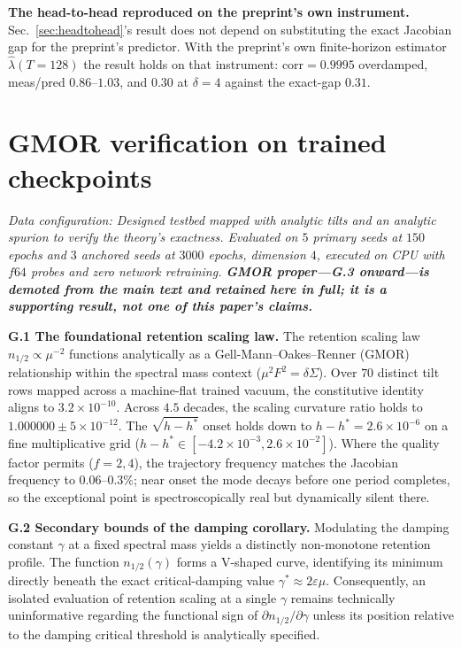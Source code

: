 \documentclass{article}
\begin{document}
\textbf{The head-to-head reproduced on the preprint's own instrument.} Sec.~\ref{sec:headtohead}'s result does not depend on substituting the exact Jacobian gap for the preprint's predictor. With the preprint's own finite-horizon estimator $\hat\lambda(T{=}128)$ the result holds on that instrument: $\mathrm{corr}=0.9995$ overdamped, meas/pred $0.86$--$1.03$, and $0.30$ at $\delta=4$ against the exact-gap $0.31$.

\section{GMOR verification on trained checkpoints}\label{app:gmor}

\emph{Data configuration: Designed testbed mapped with analytic tilts and an analytic spurion to verify the theory's exactness. Evaluated on $5$ primary seeds at $150$ epochs and $3$ anchored seeds at $3000$ epochs, dimension $4$, executed on CPU with $f64$ probes and zero network retraining. \textbf{GMOR proper---G.3 onward---is demoted from the main text and retained here in full; it is a supporting result, not one of this paper's claims.}}

\textbf{G.1 The foundational retention scaling law.} The retention scaling law $n_{1/2}\propto\mu^{-2}$ functions analytically as a Gell-Mann--Oakes--Renner (GMOR) relationship within the spectral mass context ($\mu^2F^2=\delta\Sigma$). Over $70$ distinct tilt rows mapped across a machine-flat trained vacuum, the constitutive identity aligns to $3.2{\times}10^{-10}$. Across $4.5$ decades, the scaling curvature ratio holds to $1.000000\pm5{\times}10^{-12}$. The $\sqrt{h-h^*}$ onset holds down to $h-h^*=2.6{\times}10^{-6}$ on a fine multiplicative grid ($h-h^*\in[-4.2{\times}10^{-3},2.6{\times}10^{-2}]$). Where the quality factor permits ($f=2,4$), the trajectory frequency matches the Jacobian frequency to $0.06$--$0.3\%$; near onset the mode decays before one period completes, so the exceptional point is spectroscopically real but dynamically silent there.

\textbf{G.2 Secondary bounds of the damping corollary.} Modulating the damping constant $\gamma$ at a fixed spectral mass yields a distinctly non-monotone retention profile. The function $n_{1/2}(\gamma)$ forms a V-shaped curve, identifying its minimum directly beneath the exact critical-damping value $\gamma^*\approx2\varepsilon\mu$. Consequently, an isolated evaluation of retention scaling at a single $\gamma$ remains technically uninformative regarding the functional sign of $\partial n_{1/2}/\partial\gamma$ unless its position relative to the damping critical threshold is analytically specified.
\end{document}
